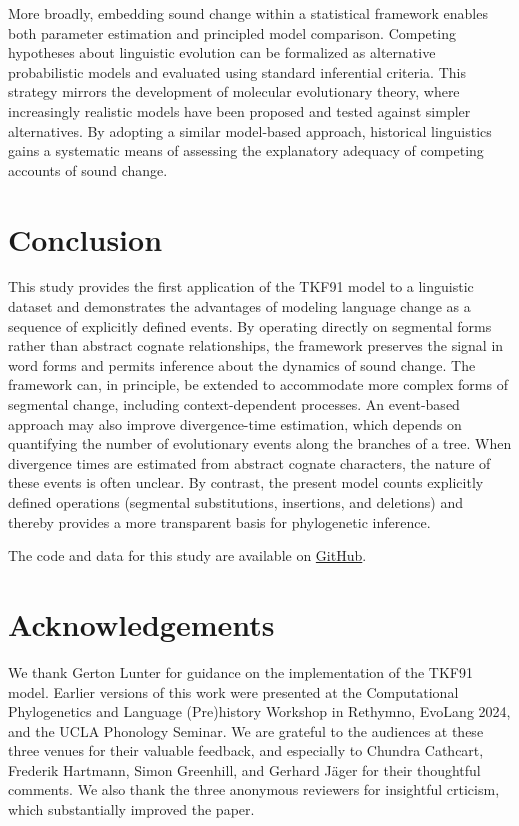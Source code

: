 \documentclass[numsec,webpdf,modern,large,namedate]{oup-authoring-template}
\begin{document}
More broadly, embedding sound change within a statistical framework enables both parameter estimation and principled model comparison. Competing hypotheses about linguistic evolution can be formalized as alternative probabilistic models and evaluated using standard inferential criteria. This strategy mirrors the development of molecular evolutionary theory, where increasingly realistic models have been proposed and tested against simpler alternatives. By adopting a similar model-based approach, historical linguistics gains a systematic means of assessing the explanatory adequacy of competing accounts of sound change. 

\section{Conclusion}
\label{PaperSections_Conclusion}
This study provides the first application of the TKF91 model to a linguistic dataset and demonstrates the advantages of modeling language change as a sequence of explicitly defined events. By operating directly on segmental forms rather than abstract cognate relationships, the framework preserves the signal in word forms and permits inference about the dynamics of sound change. The framework can, in principle, be extended to accommodate more complex forms of segmental change, including context-dependent processes. An event-based approach may also improve divergence-time estimation, which depends on quantifying the number of evolutionary events along the branches of a tree. When divergence times are estimated from abstract cognate characters, the nature of these events is often unclear. By contrast, the present model counts explicitly defined operations (segmental substitutions, insertions, and deletions) and thereby provides a more transparent basis for phylogenetic inference. 

The code and data for this study are available on \href{https://github.com/jhuelsenbeck/Linguistomics}{GitHub}. 

\section{Acknowledgements}
\label{PaperSections_Acknowledgements}
We thank Gerton Lunter for guidance on the implementation of the TKF91 model. Earlier versions of this work were presented at the Computational Phylogenetics and Language (Pre)history Workshop in Rethymno, EvoLang 2024, and the UCLA Phonology Seminar. We are grateful to the audiences at these three venues for their valuable feedback, and especially to Chundra Cathcart, Frederik Hartmann, Simon Greenhill, and Gerhard J\"{a}ger for their thoughtful comments. We also thank the three anonymous reviewers for insightful crticism, which substantially improved the paper.




\end{document}
